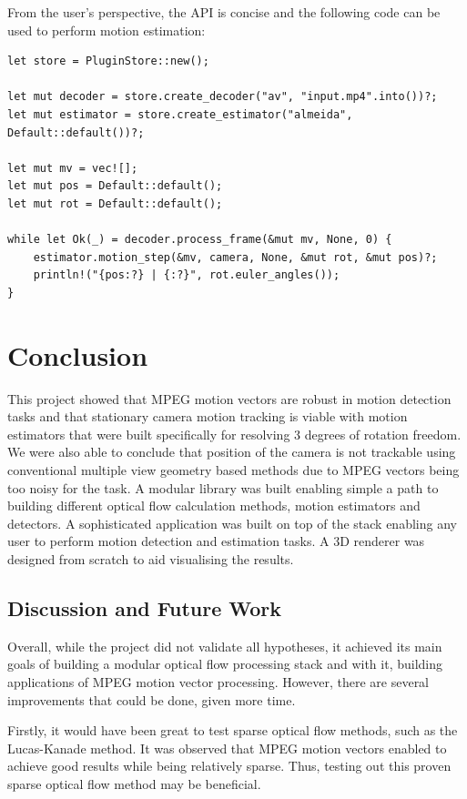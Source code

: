 \documentclass[11pt,english]{report}
\begin{document}
From the user's perspective, the API is concise and the following code can be used to perform motion estimation:

\begin{verbatim}
let store = PluginStore::new();

let mut decoder = store.create_decoder("av", "input.mp4".into())?;
let mut estimator = store.create_estimator("almeida", Default::default())?;

let mut mv = vec![];
let mut pos = Default::default();
let mut rot = Default::default();

while let Ok(_) = decoder.process_frame(&mut mv, None, 0) {
    estimator.motion_step(&mv, camera, None, &mut rot, &mut pos)?;
    println!("{pos:?} | {:?}", rot.euler_angles());
}
\end{verbatim}

\chapter{Conclusion}

This project showed that MPEG motion vectors are robust in motion detection tasks and that stationary camera motion tracking is viable with motion estimators that were built specifically for resolving 3 degrees of rotation freedom. We were also able to conclude that position of the camera is not trackable using conventional multiple view geometry based methods due to MPEG vectors being too noisy for the task. A modular library was built enabling simple a path to building different optical flow calculation methods, motion estimators and detectors. A sophisticated application was built on top of the stack enabling any user to perform motion detection and estimation tasks. A 3D renderer was designed from scratch to aid visualising the results.

\section{Discussion and Future Work}

Overall, while the project did not validate all hypotheses, it achieved its main goals of building a modular optical flow processing stack and with it, building applications of MPEG motion vector processing. However, there are several improvements that could be done, given more time.

Firstly, it would have been great to test sparse optical flow methods, such as the Lucas-Kanade method\cite{lucas-kanade}. It was observed that MPEG motion vectors enabled to achieve good results while being relatively sparse. Thus, testing out this proven sparse optical flow method may be beneficial.
\end{document}
